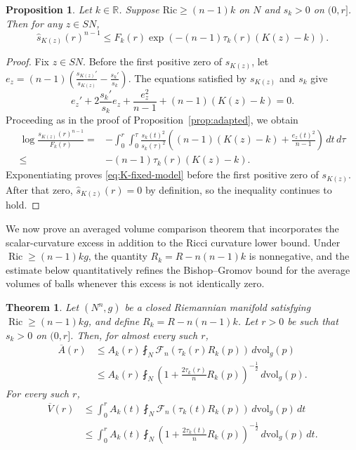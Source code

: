 \documentclass[11pt, reqno]{amsart}
\newtheorem{theorem}{Theorem}
\newtheorem{proposition}{Proposition}
\begin{document}
\begin{proposition}\label{prop:K-fixed-model}
Let $k\in \mathbb R$. Suppose $\mathrm{Ric}\ge (n-1)k$ on $N$ and $s_k>0$ on $(0, r]$. Then for any $z\in SN$,
\begin{equation}\label{eq:K-fixed-model}
\widehat s_{K(z)}(r)^{n-1}
\le
F_k(r)
\exp\left(
-(n-1)\tau_k(r)(K(z)-k)
\right).
\end{equation}
\end{proposition}

\begin{proof}
Fix $z\in SN$. Before the first positive zero of $s_{K(z)}$, let
$e_z = (n-1)\left(\frac{s_{K(z)}'}{s_{K(z)}} - \frac{s_k'}{s_k} \right)$.
The equations satisfied by $s_{K(z)}$ and $s_k$ give
$$
e_z' + 2\frac{s_k'}{s_k}e_z + \frac{e_z^2}{n-1} + (n-1)(K(z)-k) = 0.
$$
Proceeding as in the proof of Proposition~\ref{prop:adapted}, we obtain
\begin{align*}
\log\frac{s_{K(z)}(r)^{n-1}}{F_k(r)}
={}&
-\int_0^r\int_0^\tau
\frac{s_k(t)^2}{s_k(\tau)^2}
\left(
(n-1)(K(z)-k)+\frac{e_z(t)^2}{n-1}
\right)\, dt\, d\tau\\
\le {}&
-(n-1)\tau_k(r)(K(z)-k).
\end{align*}
Exponentiating proves \eqref{eq:K-fixed-model} before the first positive
zero of $s_{K(z)}$. After that zero, $\widehat s_{K(z)}(r)=0$ by
definition, so the inequality continues to hold.
\end{proof}

We now prove an averaged volume comparison theorem that incorporates the scalar-curvature excess in addition to the Ricci curvature lower bound. Under $\operatorname{Ric}\ge (n-1)kg$, the quantity $R_k=R-n(n-1)k$ is nonnegative, and the estimate below quantitatively refines the Bishop--Gromov bound for the average volumes of balls whenever this excess is not identically zero.
\begin{theorem}\label{thm:scalar-excess-metric-balls}
Let $(N^n, g)$ be a closed Riemannian manifold satisfying $\operatorname{Ric}\ge (n-1)kg$,
and define $R_k=R-n(n-1)k$.
Let $r>0$ be such that $s_k>0$ on $(0, r]$. Then, for almost every such $r$,
\begin{align}
\overline A(r)
& \le
A_k(r)\fint_N
\mathcal F_n\left(\tau_k(r)R_k(p)\right)\, d\mathrm{vol}_g(p)
\label{eq:scalar-excess-area}\\
& \le
A_k(r)\fint_N
\left(
1+\frac{2\tau_k(r)}{n}R_k(p)
\right)^{-\frac12}
\, d\mathrm{vol}_g(p).
\label{eq:elementary-scalar-excess-area}
\end{align}
For every such $r$,
\begin{align}
\overline V(r)
& \le
\int_0^r
A_k(t)\fint_N
\mathcal F_n\left(\tau_k(t)R_k(p)\right)
\, d\mathrm{vol}_g(p)\, dt
\label{eq:scalar-excess-volume}\\
& \le
\int_0^r
A_k(t)\fint_N
\left(
1+\frac{2\tau_k(t)}{n}R_k(p)
\right)^{-\frac12}
\, d\mathrm{vol}_g(p)\, dt.
\label{eq:elementary-scalar-excess-volume}
\end{align}
\end{theorem}
\end{document}
